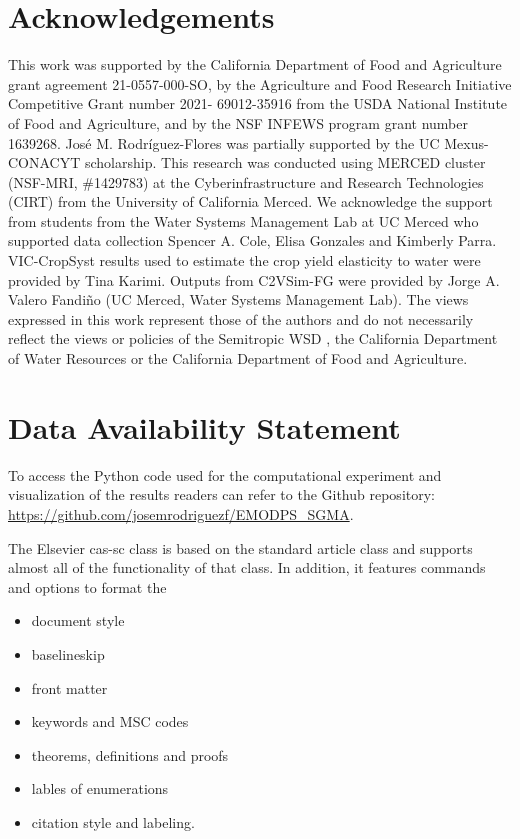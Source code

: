 \documentclass[a4paper,fleqn]{cas-sc}
\begin{document}
\section*{Acknowledgements}

This work was supported by the California Department of Food and Agriculture grant agreement 21-0557-000-SO, by the Agriculture and Food Research Initiative Competitive Grant number 2021- 69012-35916 from the USDA National Institute of Food and Agriculture, and by the NSF INFEWS program grant number 1639268. José M. Rodríguez-Flores was partially supported by the UC Mexus-CONACYT scholarship. This research was conducted using MERCED cluster (NSF-MRI, \#1429783) at the Cyberinfrastructure and Research Technologies (CIRT) from the University of California Merced. We acknowledge the support from students from the Water Systems Management Lab at UC Merced who supported data collection Spencer A. Cole, Elisa Gonzales and Kimberly Parra. VIC-CropSyst results used to estimate the crop yield elasticity to water were provided by Tina Karimi. Outputs from  C2VSim-FG were provided by Jorge A. Valero Fandiño (UC Merced, Water Systems Management Lab). The views expressed in this work represent those of the authors and do not necessarily reflect the views or policies of the Semitropic WSD , the California Department of Water Resources or the California Department of Food and Agriculture. 

\section*{Data Availability Statement}

To access the Python code used for the computational experiment and  visualization of the results readers can refer to the Github repository: \url{https://github.com/josemrodriguezf/EMODPS_SGMA}.

\printcredits


The Elsevier cas-sc class is based on the
standard article class and supports almost all of the functionality of
that class. In addition, it features commands and options to format the
\begin{itemize} \item document style \item baselineskip \item front
matter \item keywords and MSC codes \item theorems, definitions and
proofs \item lables of enumerations \item citation style and labeling.
\end{itemize}
\end{document}
